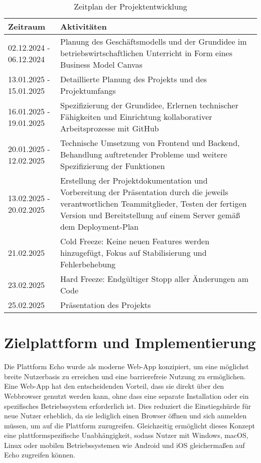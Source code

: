 \documentclass[a4paper,12pt]{article}
\begin{document}
\begin{table}[h]
    \centering
    \renewcommand{\arraystretch}{1.2}
    \setlength{\tabcolsep}{8pt} %
    \begin{tabular}{|p{4cm}|p{11cm}|} %
        \hline
        \textbf{Zeitraum} & \textbf{Aktivitäten} \\
        \hline
        02.12.2024 - 06.12.2024 &
        Planung des Geschäftsmodells und der Grundidee im
        betriebswirtschaftlichen Unterricht in Form eines Business Model Canvas
        \\
        \hline
        13.01.2025 - 15.01.2025 &
        Detaillierte Planung des Projekts und des Projektumfangs \\
        \hline
        16.01.2025 - 19.01.2025 &
        Spezifizierung der Grundidee, Erlernen technischer Fähigkeiten und
        Einrichtung kollaborativer Arbeitsprozesse mit GitHub \\
        \hline
        20.01.2025 - 12.02.2025 &
        Technische Umsetzung von Frontend und Backend, Behandlung auftretender
        Probleme und weitere Spezifizierung der Funktionen \\
        \hline
        13.02.2025 - 20.02.2025 &
        Erstellung der Projektdokumentation und Vorbereitung der Präsentation
        durch die jeweils verantwortlichen Teammitglieder, Testen der fertigen
        Version und Bereitstellung auf einem Server gemäß dem Deployment-Plan
        \\
        \hline
        21.02.2025 &
        Cold Freeze: Keine neuen Features werden hinzugefügt, Fokus auf
        Stabilisierung und Fehlerbehebung \\
        \hline
        23.02.2025 &
        Hard Freeze: Endgültiger Stopp aller Änderungen am Code \\
        \hline
        25.02.2025 &
        Präsentation des Projekts \\
        \hline
    \end{tabular}
    \caption{Zeitplan der Projektentwicklung}
\end{table}

\newpage
\section{Zielplattform und Implementierung}
Die Plattform Echo wurde als moderne Web-App konzipiert, um eine möglichst
breite Nutzerbasis zu erreichen und eine barrierefreie Nutzung zu ermöglichen.
Eine Web-App hat den entscheidenden Vorteil, dass sie direkt über den
Webbrowser genutzt werden kann, ohne dass eine separate Installation oder ein
spezifisches Betriebssystem erforderlich ist. Dies reduziert die Einstiegshürde
für neue Nutzer erheblich, da sie lediglich einen Browser öffnen und sich
anmelden müssen, um auf die Plattform zuzugreifen. Gleichzeitig ermöglicht
dieses Konzept eine plattformspezifische Unabhängigkeit, sodass Nutzer mit
Windows, macOS, Linux oder mobilen Betriebssystemen wie Android und iOS
gleichermaßen auf Echo zugreifen können.
\end{document}

